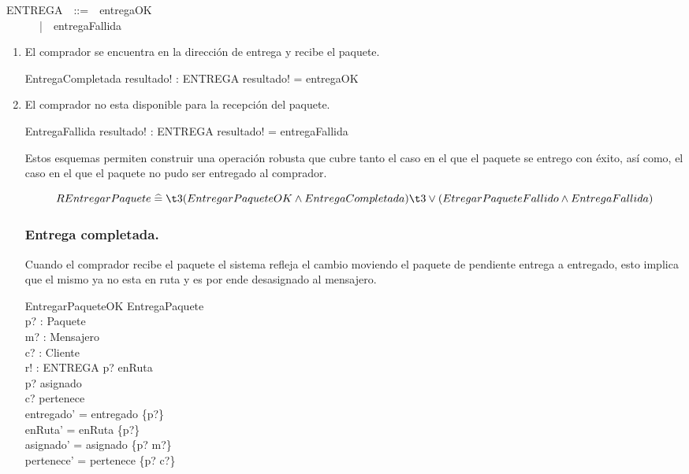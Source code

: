 \documentclass[12pt,a4paper]{article}
\renewcommand*{\defs}{\mathrel{\widehat{=}}}
\begin{document}
\begin{zed}
ENTREGA~~::=~~entregaOK\\
~~~~~~|~~entregaFallida
\end{zed}

\begin{enumerate}
\item El comprador se encuentra en la dirección de entrega y recibe el paquete.

\begin{schema}{EntregaCompletada}
resultado! : ENTREGA
\where
resultado! = entregaOK
\end{schema}

\item El comprador no esta disponible para la recepción del paquete.

\begin{schema}{EntregaFallida}
resultado! : ENTREGA
\where
resultado! = entregaFallida
\end{schema}

Estos esquemas permiten construir una operación robusta que cubre tanto el caso en el que el paquete se entrego con éxito, así como, el caso en el que el paquete no pudo ser entregado al comprador.

\[ REntregarPaquete \defs\\ 
\t3 (EntregarPaqueteOK \wedge EntregaCompletada)\\ 
\t3 \lor (EtregarPaqueteFallido \wedge EntregaFallida) \]

\newpage
\subsubsection*{Entrega completada.}
Cuando el comprador recibe el paquete el sistema refleja el cambio moviendo el paquete de pendiente entrega a entregado, esto implica que el mismo ya no esta en ruta y es por ende desasignado al mensajero.

\begin{schema}{EntregarPaqueteOK}
\Delta EntregaPaquete\\
p? : Paquete\\
m? : Mensajero\\
c? : Cliente\\
r! : ENTREGA
\where
p? \in  enRuta\\
p? \in \dom asignado\\
c? \in \ran pertenece\\
entregado' = entregado \cup \{p?\}\\
enRuta' = enRuta \setminus \{p?\}\\
asignado' = asignado \setminus \{p? \mapsto m?\}\\
pertenece' = pertenece \setminus \{p? \mapsto c?\}
\end{schema}


\end{enumerate}
\end{document}
